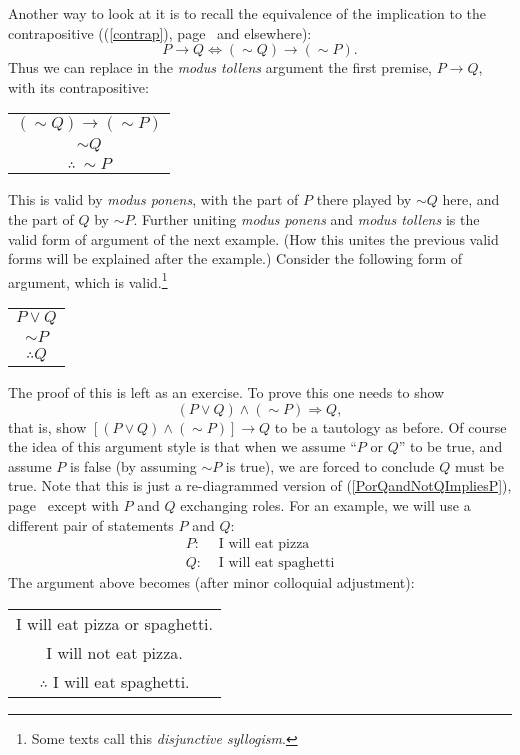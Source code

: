 Another way to look at it is to recall the equivalence of the 
implication to the contrapositive ((\ref{contrap}),
page~\pageref{contrap} and elsewhere):
$$P\longrightarrow Q\iff(\sim Q)\longrightarrow(\sim P).$$
Thus we can replace in the {\it modus tollens}
argument the first premise, $P\rightarrow Q$, 
with its contrapositive:
\begin{center}
\begin{tabular}{c}
$(\sim Q)\longrightarrow(\sim P)$\\
$\sim Q$\\ \hline
$\therefore\ \sim P$
\end{tabular}
\end{center}
This is valid by {\it modus ponens}, with the part of 
$P$ there played by $\sim Q$ here, and the part of $Q$ by
$\sim P$.
Further uniting {\it modus ponens} and {\it modus tollens}
is the valid form of argument of the next example.
(How this unites the previous valid forms will be explained
after the example.)
\bex Consider the following form of argument, which is 
valid.\footnote{%
Some texts call this {\it disjunctive syllogism}.%
}
\begin{center}
\begin{tabular}{c}
$P\vee Q$\\
$\sim P$\\ \hline
$\therefore Q$
\end{tabular}
\end{center}
The proof of this is left as an exercise.  To prove this one
needs to show
$$(P\vee Q)\wedge(\sim P)\Longrightarrow Q,$$
that is, show $[(P\vee Q)\wedge(\sim P)]\longrightarrow Q$
to be a tautology as before.
Of course the idea of this argument style is
that when we assume ``$P$ or $Q$'' to be true, and assume
$P$ is false (by assuming $\sim P$
is true), we are forced to conclude $Q$
must be true.  Note that this is just a re-diagrammed 
version of (\ref{PorQandNotQImpliesP}), page~\pageref{PorQandNotQImpliesP}
except with $P$ and
$Q$ exchanging roles.
For an example, we will use a different pair of statements $P$ and $Q$:
\begin{align*}
P:&\text{ I will eat pizza}\\
Q:&\text{ I will eat spaghetti}\end{align*}
The argument above becomes (after minor colloquial adjustment):
\begin{center}
\begin{tabular}{c}
I will eat pizza or spaghetti.\\
I will not eat pizza.\\ \hline
$\therefore$ I will eat spaghetti.
\end{tabular}
\end{center}



